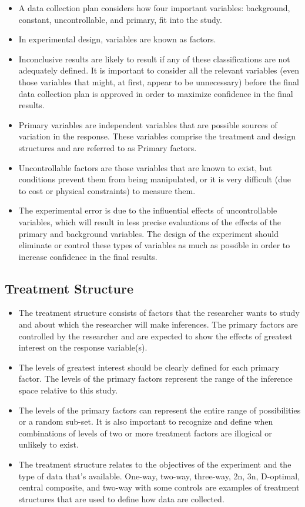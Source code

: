 \documentclass[a4paper,12pt]{article}
\begin{document}
\begin{itemize}
\item A data collection plan considers how four important variables: background, constant, uncontrollable, and primary, fit into the study. 
\item 
In experimental design, variables are known as factors.
\item 
Inconclusive results are likely to result if any of these classifications are not adequately defined. It is important to consider all the relevant
variables (even those variables that might, at first, appear to be unnecessary) before the final data collection plan is approved in order to maximize confidence in the final results.
\item 
Primary variables are independent variables that are possible sources of variation in the response. These variables comprise the treatment and design structures and are referred to as Primary factors.
\item 
Uncontrollable factors are those variables that are known to exist, but
conditions prevent them from being manipulated, or it is very difficult (due to cost or physical constraints) to measure them.
\item 

The experimental error is due to the influential effects of uncontrollable variables, which will result in less precise evaluations of the effects of the primary and background variables. The design of the experiment should eliminate or control these types of variables as much as possible in order to increase confidence in the final results.
\end{itemize}

\subsection{Treatment Structure}
\begin{itemize}
\item The treatment structure consists of factors that the researcher wants to study and about which the researcher will make inferences. The primary factors are controlled by the researcher and are expected to show the effects of greatest interest on the response variable(s). 
\item 
The levels of greatest interest should be clearly defined for each primary factor. The levels of the primary factors represent the range of the inference space relative to this study. 
\item 
The levels of the primary factors can represent the entire range of possibilities or a random sub-set. It is also important to recognize and define when combinations of levels of two or more treatment factors are illogical or unlikely to exist.
\item 
The treatment structure relates to the objectives of the experiment and the type of data that’s available. One-way, two-way, three-way, 2n, 3n, D-optimal, central composite, and two-way with some controls are examples of treatment structures that are used to define how
data are collected. 
\end{itemize}
\end{document}

